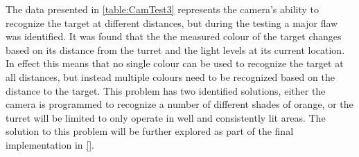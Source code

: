 
The data presented in \autoref{table:CamTest3} represents the camera's ability
to recognize the target at different distances, but during the testing a major
flaw was identified. It was found that the the measured colour of the target
changes based on its distance from the turret and the light levels at its
current location. In effect this means that no single colour can be used to
recognize the target at all distances, but instead multiple colours need to be
recognized based on the distance to the target. This problem has two identified
solutions, either the camera is programmed to recognize a number of different
shades of orange, or the turret will be limited to only operate in well and
consistently lit areas. The solution to this problem will be further explored
as part of the final implementation in \autoref{}.

